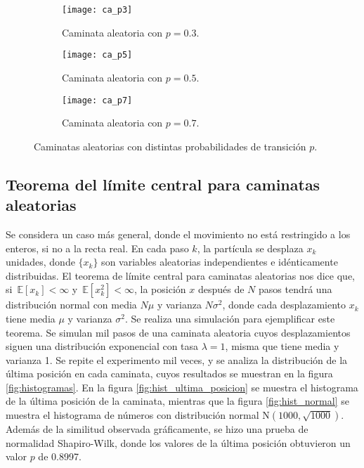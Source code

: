 \documentclass[12pt,letterpaper]{article}
\newcommand\esp[1]{\, \mathbb{E} \left\lbrack #1 \right\rbrack}
\begin{document}
\begin{figure}
	\centering
	\begin{subfigure}{0.32\linewidth}
		\texttt{[image: ca\_p3]}
		\caption{Caminata aleatoria con $p = 0.3$.}
		\label{fig:ca_p3}
	\end{subfigure}
	\hfill
	\begin{subfigure}{0.32\linewidth}
		\texttt{[image: ca\_p5]}
		\caption{Caminata aleatoria con $p = 0.5$.}
		\label{fig:ca_p5}
	\end{subfigure}
	\hfill
	\begin{subfigure}{0.32\linewidth}
		\texttt{[image: ca\_p7]}
		\caption{Caminata aleatoria con $p = 0.7$.}
		\label{fig:ca_p7}
	\end{subfigure}
	\caption{Caminatas aleatorias con distintas probabilidades de transición $p$.} 
	\label{fig:caminatas_aleatorias}
\end{figure}

\subsection{Teorema del límite central para caminatas aleatorias}
Se considera un caso más general, donde el movimiento no está restringido a los enteros, si no a la recta real.  En cada paso $k$, la partícula se desplaza $x_k$ unidades, donde $\lbrace x_k \rbrace$ son variables aleatorias independientes e idénticamente distribuidas. El teorema de límite central para caminatas aleatorias \cite{random_walks_yt} nos dice que, si $\esp{x_k} < \infty$ y $\esp{x_{k}^{2}} < \infty$, la posición $x$ después de $N$ pasos tendrá una distribución normal con media $N \mu$ y varianza $N \sigma^2$, donde cada desplazamiento $x_k$ tiene media $\mu$ y varianza $\sigma^2$. Se realiza una simulación para ejemplificar este teorema. Se simulan mil pasos de una caminata aleatoria cuyos desplazamientos siguen una distribución exponencial con tasa $\lambda=1$, misma que tiene media y varianza 1. Se repite el experimento mil veces, y se analiza la distribución de la última posición en cada caminata, cuyos resultados se muestran en la figura \ref{fig:histogramas}. En la figura \ref{fig:hist_ultima_posicion} se muestra el histograma de la última posición de la caminata, mientras que la figura \ref{fig:hist_normal} se muestra el histograma de números con distribución normal $\mathrm{N}(1000, \sqrt{1000})$. Además de la similitud observada gráficamente, se hizo una prueba de normalidad Shapiro-Wilk, donde los valores de la última posición obtuvieron un valor $p$ de 0.8997. 
\end{document}
